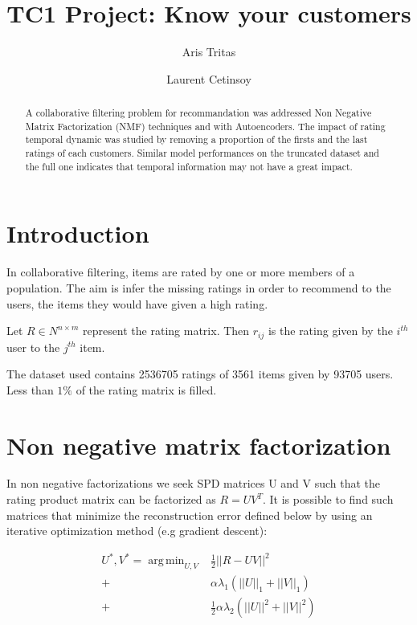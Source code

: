 \documentclass[10pt,twocolumn]{article}
\title{TC1 Project: Know your customers}
\author{Aris Tritas \and Laurent Cetinsoy}
\DeclareMathOperator*{\argmin}{arg\,min}
\begin{document}
\maketitle

\begin{abstract}

A collaborative filtering problem for recommandation was addressed Non Negative Matrix Factorization (NMF) techniques and with Autoencoders. The impact of rating temporal dynamic was studied by removing a proportion of the firsts and the last ratings of each customers. Similar model performances on the truncated dataset and the full one indicates that temporal information may not have a great impact.

\end{abstract}

\section{Introduction}

In collaborative filtering, items are rated by one or more members of a population. The aim is infer the missing ratings in order to recommend to the users, the items they would have given a high rating. 

Let $R \in N^{ n \times m}$ represent the rating matrix. 
Then $r_{ij}$ is the rating given by the $i^{th}$ user to the $j^{th}$ item.


The dataset used contains 2536705 ratings of 3561 items given by 93705 users. Less than  $1\% $ of the rating matrix is filled.



\section{Non negative matrix factorization}

In non negative factorizations we seek SPD matrices U and V such that the rating product matrix can be factorized as $R = UV^T$. It is possible to find such matrices that minimize the reconstruction error defined below by using an iterative optimization method (e.g gradient descent): 

\begin{equation*}
\begin{split}
 U^*, V^* = \argmin_{U,V} & \frac{1}{2} ||R - UV||^2 \\
			 + & \alpha \lambda_1 (||U||_1 + ||V||_1) \\
			  + & \frac{1}{2} \alpha \lambda_2  (||U||^2 + ||V||^2) 
\end{split}
\end{equation*}  
\end{document}
